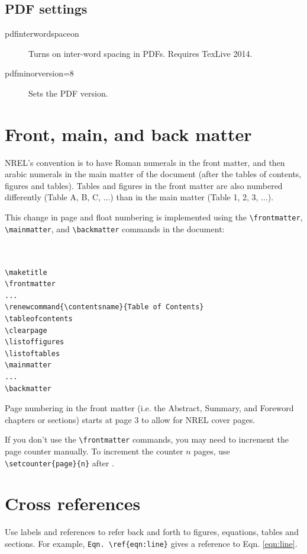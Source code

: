 \subsection{PDF settings}
\begin{description}
\item[pdfinterwordspaceon]{Turns on inter-word spacing in PDFs. Requires TexLive 2014.}
\item[pdfminorversion=8]{Sets the PDF version.}
\end{description}

\section{Front, main, and back matter}
NREL's convention is to have Roman numerals in the front matter, and then arabic numerals in the main matter of the document (after the tables of contents, figures and tables). Tables and figures in the front matter are also numbered differently (Table A, B, C, ...) than in the main matter (Table 1, 2, 3, ...).

This change in page and float numbering is implemented using the \verb+\frontmatter+, \verb+\mainmatter+, and \verb+\backmatter+ commands in the document:

\begin{verbatim}


\maketitle
\frontmatter
...
\renewcommand{\contentsname}{Table of Contents}
\tableofcontents
\clearpage
\listoffigures
\listoftables
\mainmatter
...
\backmatter

\end{verbatim}

Page numbering in the front matter (i.e. the Abstract, Summary, and Foreword chapters or sections) starts at page 3 to allow for NREL cover pages.

If you don't use the \verb+\frontmatter+ commands, you may need to increment the page counter manually. To increment the counter $n$ pages, use \verb+\setcounter{page}{n}+ after \verb++.

\section{Cross references}
Use labels and references to refer back and forth to figures, equations, tables and sections. For example, \verb+Eqn. \ref{eqn:line}+ gives a reference to Eqn. \ref{eqn:line}.

